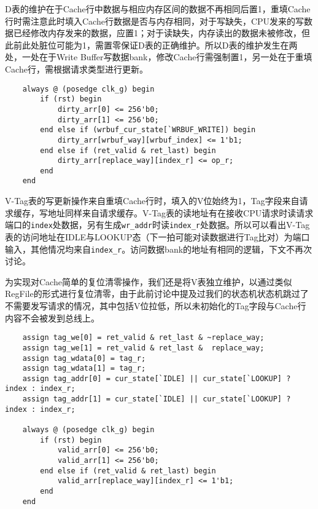 \documentclass[UTF-8,twoside,c5size]{ctexart}
\begin{document}
    D表的维护在于Cache行中数据与相应内存区间的数据不再相同后置1，重填Cache行时需注意此时填入Cache行数据是否与内存相同，对于写缺失，CPU发来的写数据已经修改内存发来的数据，应置1；对于读缺失，内存读出的数据未被修改，但此前此处脏位可能为1，需置零保证D表的正确维护。所以D表的维护发生在两处，一处在于Write Buffer写数据bank，修改Cache行需强制置1，另一处在于重填Cache行，需根据请求类型进行更新。
    \begin{verbatim}
    always @ (posedge clk_g) begin
        if (rst) begin
            dirty_arr[0] <= 256'b0;
            dirty_arr[1] <= 256'b0;
        end else if (wrbuf_cur_state[`WRBUF_WRITE]) begin
            dirty_arr[wrbuf_way][wrbuf_index] <= 1'b1;
        end else if (ret_valid & ret_last) begin
            dirty_arr[replace_way][index_r] <= op_r;
        end
    end
    \end{verbatim}

    V-Tag表的写更新操作来自重填Cache行时，填入的V位始终为1，Tag字段来自请求缓存，写地址同样来自请求缓存。V-Tag表的读地址有在接收CPU请求时读请求端口的\texttt{index}处数据，另有生成\texttt{wr\_addr}时读\texttt{index\_r}处数据。所以可以看出V-Tag表的访问地址在IDLE与LOOKUP态（下一拍可能对读数据进行Tag比对）为端口输入，其他情况均来自\texttt{index\_r}。访问数据bank的地址有相同的逻辑，下文不再次讨论。
    
    为实现对Cache简单的复位清零操作，我们还是将V表独立维护，以通过类似RegFile的形式进行复位清零，由于此前讨论中提及过我们的状态机状态机跳过了不需要发写请求的情况，其中包括V位拉低，所以未初始化的Tag字段与Cache行内容不会被发到总线上。
    \begin{verbatim}
    assign tag_we[0] = ret_valid & ret_last & ~replace_way;
    assign tag_we[1] = ret_valid & ret_last &  replace_way;
    assign tag_wdata[0] = tag_r;
    assign tag_wdata[1] = tag_r;
    assign tag_addr[0] = cur_state[`IDLE] || cur_state[`LOOKUP] ? index : index_r;
    assign tag_addr[1] = cur_state[`IDLE] || cur_state[`LOOKUP] ? index : index_r;
    
    always @ (posedge clk_g) begin
        if (rst) begin
            valid_arr[0] <= 256'b0;
            valid_arr[1] <= 256'b0;
        end else if (ret_valid & ret_last) begin
            valid_arr[replace_way][index_r] <= 1'b1;
        end
    end
    \end{verbatim}
    
\end{document}
